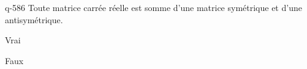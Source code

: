 \begin{truefalse}{q-586}
Toute matrice carrée réelle est somme d'une matrice symétrique et d'une antisymétrique.
\item* Vrai
\item Faux
\end{truefalse}

